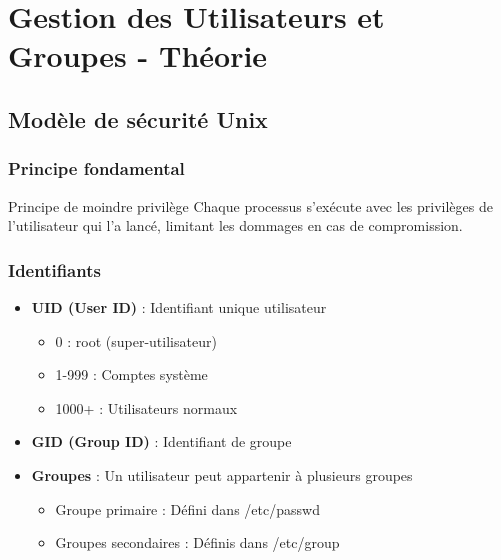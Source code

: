 \documentclass[12pt,a4paper]{article}
\begin{document}

\section{Gestion des Utilisateurs et Groupes - Théorie}

\subsection{Modèle de sécurité Unix}

\subsubsection{Principe fondamental}

\begin{infobox}{Principe de moindre privilège}
Chaque processus s'exécute avec les privilèges de l'utilisateur qui l'a lancé, limitant les dommages en cas de compromission.
\end{infobox}

\subsubsection{Identifiants}

\begin{itemize}
    \item \textbf{UID (User ID)} : Identifiant unique utilisateur
    \begin{itemize}
        \item 0 : root (super-utilisateur)
        \item 1-999 : Comptes système
        \item 1000+ : Utilisateurs normaux
    \end{itemize}
    \item \textbf{GID (Group ID)} : Identifiant de groupe
    \item \textbf{Groupes} : Un utilisateur peut appartenir à plusieurs groupes
    \begin{itemize}
        \item Groupe primaire : Défini dans /etc/passwd
        \item Groupes secondaires : Définis dans /etc/group
    \end{itemize}
\end{itemize}
\end{document}
